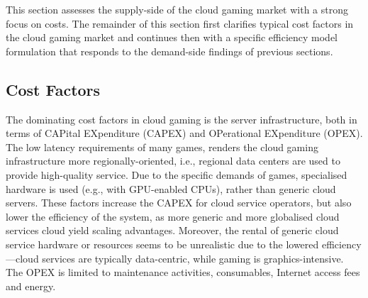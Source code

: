 






This section assesses the supply-side of the cloud gaming market with a strong focus on costs. The remainder of this section first clarifies typical cost factors in the cloud gaming market and continues then with a specific efficiency model formulation that responds to the demand-side findings of previous sections.

\subsection{Cost Factors}

The dominating cost factors in cloud gaming is the server infrastructure, both in terms of CAPital EXpenditure (CAPEX) and OPerational EXpenditure (OPEX). The low latency requirements of many games, renders the cloud gaming infrastructure more regionally-oriented, i.e., regional data centers are used to provide high-quality service. Due to the specific demands of games, specialised hardware is used (e.g., with GPU-enabled CPUs), rather than generic cloud servers. These factors increase the CAPEX for cloud service operators, but also lower the efficiency of the system, as more generic and more globalised cloud services cloud yield scaling advantages. Moreover, the rental of generic cloud service hardware or resources seems to be unrealistic due to the lowered efficiency---cloud services are typically data-centric, while gaming is graphics-intensive. The OPEX is limited to maintenance activities, consumables, Internet access fees and energy.

